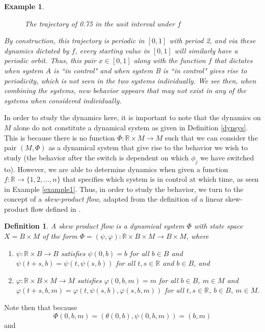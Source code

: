 \documentclass[11pt]{article}
\newtheorem{defn}[thm]{Definition}
\newtheorem{ex}[thm]{Example}
\begin{document}
\begin{ex}
\begin{figure}[!ht]
\begin{center}
\caption{The trajectory of 0.75 in the unit interval under $f$}
\end{center}
\end{figure}

By construction, this trajectory is periodic in $[0,1]$ with period 2, and via these dynamics dictated by $f$, every starting value in $[0,1]$ will similarly have a periodic orbit. Thus, this pair $x\in[0,1]$ along with the function $f$ that dictates when system $A$ is ``in control" and when system B is ``in control" gives rise to periodicity, which is not seen in the two systems individually.   We see then, when combining the systems, new behavior appears that may not exist in any of the systems when considered individually.  \end{ex}

\indent In order to study the dynamics here, it is important to note that the dynamics on $M$ alone do not constitute a dynamical system as given in Definition \ref{dynsys}.  This is because there is no function $\Phi:\mathbb{R}\times M\rightarrow M$ such that we can consider the pair $(M,\Phi)$ as a dynamical system that give rise to the behavior we wish to study (the behavior after the switch is dependent on which $\phi_j$ we have switched to).  However, we are able to determine dynamics when given a function $f:\mathbb{R}\rightarrow\{1,2,\ldots,n\}$ that specifies which system is in control at which time, as seen in Example \ref{example1}. Thus, in order to study the behavior, we turn to the concept of a \emph{skew-product flow}, adapted from the definition of a linear skew-product flow defined in \cite{skewproduct}.
\begin{defn}\label{skewproduct}
A skew product flow is a dynamical system $\Phi$ with state space $X=B\times M$ of the form $\Phi=(\psi,\varphi):\mathbb{R}\times B\times M\rightarrow B\times M$, where 
\begin{enumerate}
\item $\psi:\mathbb{R}\times B\rightarrow B$ satisfies $\psi(0,b)=b$ for all $b\in B$ and $\psi(t+s,b)=\psi(t,\psi(s,b))$ for all $t,s\in\mathbb{R}$ and $b\in B$, and 
\item$\varphi:\mathbb{R}\times B\times M\rightarrow M$ satisfies $\varphi(0,b,m)=m$ for all $b\in B$, $m\in M$ and $\varphi(t+s,b,m)=\varphi(t,\psi(s,b),\varphi(s,b,m))$ for all $t,s\in\mathbb{R}$, $b\in B$, $m\in M$. 
\end{enumerate}
\end{defn} 
\noindent Note then that because $$\Phi(0,b,m)=(\theta(0,b), \psi(0,b,m))=(b,m)$$ and 
\end{document}
